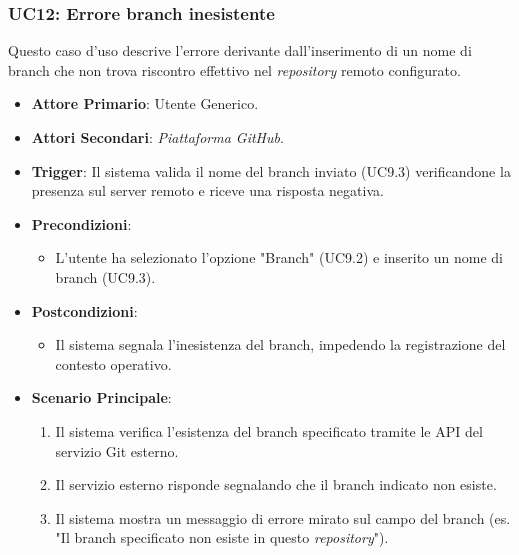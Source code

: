 \documentclass[12pt, a4paper]{article}
\begin{document}
\subsubsection{UC12: Errore branch inesistente}\label{uc:12}
Questo caso d'uso descrive l'errore derivante dall'inserimento di un nome di branch che non trova riscontro effettivo nel \textit{repository} remoto configurato.
\begin{itemize}
    \item \textbf{Attore Primario}: Utente Generico.
    \item \textbf{Attori Secondari}: \textit{Piattaforma GitHub}.
    \item \textbf{Trigger}: Il sistema valida il nome del branch inviato (UC9.3) verificandone la presenza sul server remoto e riceve una risposta negativa.
    \item \textbf{Precondizioni}:\begin{itemize}\item L'utente ha selezionato l'opzione "Branch" (UC9.2) e inserito un nome di branch (UC9.3).\end{itemize}
    \item \textbf{Postcondizioni}:\begin{itemize}\item Il sistema segnala l'inesistenza del branch, impedendo la registrazione del contesto operativo.\end{itemize}
    \item \textbf{Scenario Principale}:
    \begin{enumerate}
        \item Il sistema verifica l'esistenza del branch specificato tramite le API del servizio Git esterno.
        \item Il servizio esterno risponde segnalando che il branch indicato non esiste.
        \item Il sistema mostra un messaggio di errore mirato sul campo del branch (es. "Il branch specificato non esiste in questo \textit{repository}").
    \end{enumerate}
\end{itemize}
\end{document}
